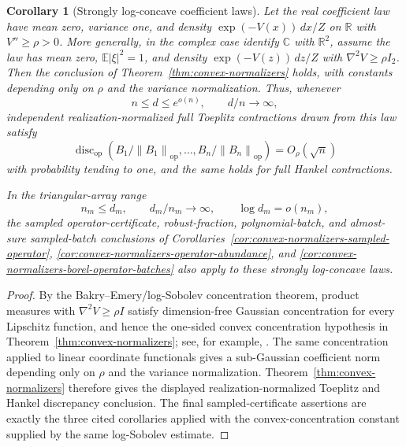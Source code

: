 \documentclass[11pt]{amsart}
\numberwithin{equation}{section}
\newtheorem{corollary}[theorem]{Corollary}
\theoremstyle{definition}
\theoremstyle{remark}
\newcommand{\C}{\mathbb C}
\newcommand{\R}{\mathbb R}
\newcommand{\op}{\mathrm{op}}
\newcommand{\discop}{\operatorname{disc}_{\op}}
\newcommand{\Exp}{\mathbb E}
\newcommand{\norm}[1]{\left\lVert #1\right\rVert}
\begin{document}
\begin{corollary}[Strongly log-concave coefficient laws]
\label{cor:strongly-log-concave-normalizers}
Let the real coefficient law have mean zero, variance one, and density
\(\exp(-V(x))\,dx/Z\) on \(\R\) with \(V''\ge\rho>0\).  More generally, in the
complex case identify \(\C\) with \(\R^2\), assume the law has mean zero,
\(\Exp|\xi|^2=1\), and density \(\exp(-V(z))\,dz/Z\) with
\(\nabla^2 V\ge\rho I_2\).  Then the conclusion of
Theorem~\ref{thm:convex-normalizers} holds, with constants depending only on
\(\rho\) and the variance normalization.  Thus, whenever
\[
  n\le d\le e^{o(n)},\qquad d/n\to\infty,
\]
independent realization-normalized full Toeplitz contractions drawn from this
law satisfy
\[
  \discop(B_1/\norm{B_1}_{\op},\ldots,B_n/\norm{B_n}_{\op})
  =O_\rho(\sqrt n)
\]
with probability tending to one, and the same holds for full Hankel
contractions.

In the triangular-array range
\[
  n_m\le d_m,\qquad d_m/n_m\to\infty,\qquad \log d_m=o(n_m),
\]
the sampled operator-certificate, robust-fraction, polynomial-batch, and
almost-sure sampled-batch conclusions of
Corollaries~\ref{cor:convex-normalizers-sampled-operator},
\ref{cor:convex-normalizers-operator-abundance}, and
\ref{cor:convex-normalizers-borel-operator-batches} also apply to these
strongly log-concave laws.
\end{corollary}

\begin{proof}
By the Bakry--Emery/log-Sobolev concentration theorem, product measures with
\(\nabla^2V\ge\rho I\) satisfy dimension-free Gaussian concentration for every
Lipschitz function, and hence the one-sided convex concentration hypothesis in
Theorem~\ref{thm:convex-normalizers}; see, for example, \cite{Ledoux}.  The same
concentration applied to linear coordinate functionals gives a sub-Gaussian
coefficient norm depending only on \(\rho\) and the variance normalization.
Theorem~\ref{thm:convex-normalizers} therefore gives the displayed
realization-normalized Toeplitz and Hankel discrepancy conclusion.  The final
sampled-certificate assertions are exactly the three cited corollaries applied
with the convex-concentration constant supplied by the same log-Sobolev
estimate.
\end{proof}
\end{document}
